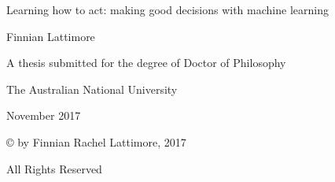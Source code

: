 \begin{titlepage}
    \begin{center}
        \vspace*{1cm}
        
        \Huge
        {Learning how to act: making good decisions with machine learning}
        
        \vspace{2cm}
        \Large
        {Finnian Lattimore}
        
        \vfill
        \Large
        A thesis submitted for the degree of Doctor of Philosophy
        
        The Australian National University
        
        November 2017
        \vspace{2cm}
    
    \normalsize
    \copyright \hspace{.01mm} by Finnian Rachel Lattimore, 2017
    
    All Rights Reserved
    \end{center}
\end{titlepage}